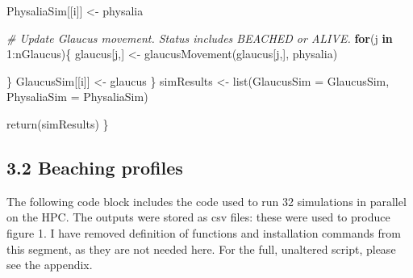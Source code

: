 \documentclass[
]{article}
\newenvironment{Shaded}{\begin{snugshade}}{\end{snugshade}}
\newcommand{\CommentTok}[1]{\textcolor[rgb]{0.56,0.35,0.01}{\textit{#1}}}
\newcommand{\ControlFlowTok}[1]{\textcolor[rgb]{0.13,0.29,0.53}{\textbf{#1}}}
\newcommand{\DecValTok}[1]{\textcolor[rgb]{0.00,0.00,0.81}{#1}}
\newcommand{\FunctionTok}[1]{\textcolor[rgb]{0.00,0.00,0.00}{#1}}
\newcommand{\NormalTok}[1]{#1}
\newcommand{\OtherTok}[1]{\textcolor[rgb]{0.56,0.35,0.01}{#1}}
\newcommand{\SpecialCharTok}[1]{\textcolor[rgb]{0.00,0.00,0.00}{#1}}
\newcommand{\StringTok}[1]{\textcolor[rgb]{0.31,0.60,0.02}{#1}}
\begin{document}
\begin{Shaded}
\begin{Highlighting}[]
\NormalTok{    PhysaliaSim[[i]] }\OtherTok{\textless{}{-}}\NormalTok{ physalia}
    
    
    \CommentTok{\# Update Glaucus movement. Status includes \textquotesingle{}BEACHED\textquotesingle{} or \textquotesingle{}ALIVE\textquotesingle{}.}
    \ControlFlowTok{for}\NormalTok{(j }\ControlFlowTok{in} \DecValTok{1}\SpecialCharTok{:}\NormalTok{nGlaucus)\{}
\NormalTok{      glaucus[j,] }\OtherTok{\textless{}{-}} \FunctionTok{glaucusMovement}\NormalTok{(glaucus[j,], physalia)}
      
\NormalTok{    \}}
\NormalTok{    GlaucusSim[[i]] }\OtherTok{\textless{}{-}}\NormalTok{ glaucus}
\NormalTok{  \}}
\NormalTok{  simResults }\OtherTok{\textless{}{-}} \FunctionTok{list}\NormalTok{(}\StringTok{\textquotesingle{}GlaucusSim\textquotesingle{}} \OtherTok{=}\NormalTok{ GlaucusSim,}
                     \StringTok{\textquotesingle{}PhysaliaSim\textquotesingle{}} \OtherTok{=}\NormalTok{ PhysaliaSim)}
  
  \FunctionTok{return}\NormalTok{(simResults)}
\NormalTok{\}}
\end{Highlighting}
\end{Shaded}

\hypertarget{beaching-profiles}{%
\subsection{3.2 Beaching profiles}\label{beaching-profiles}}

The following code block includes the code used to run 32 simulations in
parallel on the HPC. The outputs were stored as csv files: these were
used to produce figure 1. I have removed definition of functions and
installation commands from this segment, as they are not needed here.
For the full, unaltered script, please see the appendix.
\end{document}
